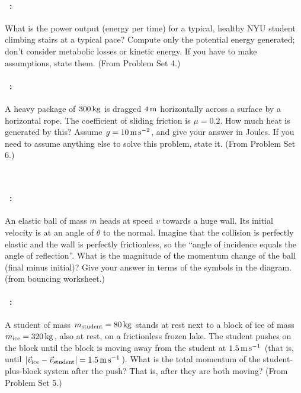 \documentclass[12pt]{article} 
\begin{document}
\vfill

\paragraph{\problemname~\theproblem:}%
What is the power output (energy per time) for a typical, healthy NYU
student climbing stairs at a typical pace? Compute only the
potential energy generated; don't consider metabolic losses or kinetic
energy. If you have to make assumptions, state them.
(From Problem Set 4.)

\vfill

\paragraph{\problemname~\theproblem:}%
A heavy package of $300\,\mathrm{kg}$ is
dragged $4\,\mathrm{m}$ horizontally across a surface by a horizontal
rope. The coefficient of sliding friction is $\mu = 0.2$. How much
heat is generated by this?  Assume $g = 10\,\mathrm{m}\,\mathrm{s}^{-2}$, and give your
answer in Joules. If you need to assume anything else to solve this
problem, state it.
(From Problem Set 6.)

\vfill
~
\clearpage

\paragraph{\problemname~\theproblem:}%
An elastic ball of mass $m$ heads at speed $v$ towards a huge wall.
Its initial velocity is at an angle of $\theta$ to the normal.
Imagine that the collision is perfectly elastic and the
wall is perfectly frictionless, so the ``angle of incidence equals the
angle of reflection''. What is the magnitude of the momentum change of the ball (final
minus initial)?
Give your answer in terms of the symbols in the diagram.
(from bouncing worksheet.)

\vfill

\paragraph{\problemname~\theproblem:}%
A student of mass $m_\mathrm{student}=80\,\mathrm{kg}$ stands at rest next to
a block of ice of mass $m_\mathrm{ice}=320\,\mathrm{kg}$, also at rest, on a
frictionless frozen lake.  The student pushes on the block until the
block is moving away from the student at $1.5\,\mathrm{m}\,\mathrm{s}^{-1}$ (that is, until
$\left|\vec{v}_\mathrm{ice}-\vec{v}_\mathrm{student}\right|=1.5\,\mathrm{m}\,\mathrm{s}^{-1}$).
What is the total momentum of the student-plus-block system after the
push? That is, after they are both moving?
(From Problem Set 5.)
\end{document}
